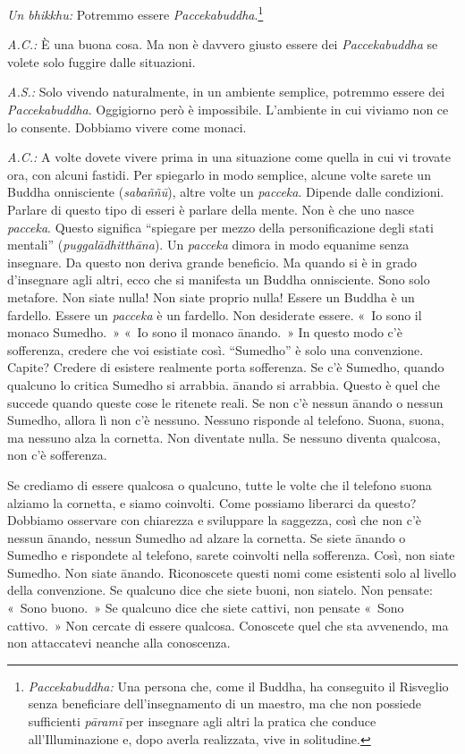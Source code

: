 \emph{Un bhikkhu:} Potremmo essere \emph{Paccekabuddha}.\footnote{\emph{Paccekabuddha:}
  Una persona che, come il Buddha, ha conseguito il Risveglio senza
  beneficiare dell'insegnamento di un maestro, ma che non possiede
  sufficienti \emph{pāramī} per insegnare agli altri la pratica che
  conduce all'Illuminazione e, dopo averla realizzata, vive in
  solitudine.}

\emph{A.C.:} È una buona cosa. Ma non è davvero giusto essere dei
\emph{Paccekabuddha} se volete solo fuggire dalle situazioni.

\emph{A.S.:} Solo vivendo naturalmente, in un ambiente semplice, potremmo
essere dei \emph{Paccekabuddha}. Oggigiorno però è impossibile.
L'ambiente in cui viviamo non ce lo consente. Dobbiamo vivere come
monaci.

\emph{A.C.:} A volte dovete vivere prima in una situazione come quella in cui
vi trovate ora, con alcuni fastidi. Per spiegarlo in modo semplice,
alcune volte sarete un Buddha onnisciente (\emph{sabaññū}), altre volte
un \emph{pacceka}. Dipende dalle condizioni. Parlare di questo tipo di
esseri è parlare della mente. Non è che uno nasce \emph{pacceka}. Questo
significa ``spiegare per mezzo della personificazione degli stati
mentali'' (\emph{puggalādhitthāna}). Un \emph{pacceka} dimora in modo
equanime senza insegnare. Da questo non deriva grande beneficio. Ma
quando si è in grado d'insegnare agli altri, ecco che si manifesta un
Buddha onnisciente. Sono solo metafore. Non siate nulla! Non siate
proprio nulla! Essere un Buddha è un fardello. Essere un \emph{pacceka}
è un fardello. Non desiderate essere. «~Io sono il monaco Sumedho.~»
«~Io sono il monaco ānando.~» In questo modo c'è sofferenza, credere che
voi esistiate così. ``Sumedho'' è solo una convenzione. Capite? Credere
di esistere realmente porta sofferenza. Se c'è Sumedho, quando qualcuno
lo critica Sumedho si arrabbia. ānando si arrabbia. Questo è quel che
succede quando queste cose le ritenete reali. Se non c'è nessun ānando o
nessun Sumedho, allora lì non c'è nessuno. Nessuno risponde al telefono.
Suona, suona, ma nessuno alza la cornetta. Non diventate nulla. Se
nessuno diventa qualcosa, non c'è sofferenza.

Se crediamo di essere qualcosa o qualcuno, tutte le volte che il
telefono suona alziamo la cornetta, e siamo coinvolti. Come possiamo
liberarci da questo? Dobbiamo osservare con chiarezza e sviluppare la
saggezza, così che non c'è nessun ānando, nessun Sumedho ad alzare la
cornetta. Se siete ānando o Sumedho e rispondete al telefono, sarete
coinvolti nella sofferenza. Così, non siate Sumedho. Non siate ānando.
Riconoscete questi nomi come esistenti solo al livello della
convenzione. Se qualcuno dice che siete buoni, non siatelo. Non pensate:
«~Sono buono.~» Se qualcuno dice che siete cattivi, non pensate «~Sono
cattivo.~» Non cercate di essere qualcosa. Conoscete quel che sta
avvenendo, ma non attaccatevi neanche alla conoscenza.

